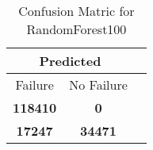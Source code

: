 \begin{table}[] 
\caption{Confusion Matric for RandomForest100} 
\label{Table: Prediction Accuracy-DMDRandomForest100OnlySunEKF-combinationReflectionperfectNoFailurePrediction-Reflection} 
\centering 
\begin{tabular} 
 {@{}ccc@{}} 
\toprule 
\multicolumn{2}{c}{\textbf{Predicted}}
 \\ \midrule 
\multicolumn{1}{|c|}{Failure} & 
\multicolumn{1}{c|}{No Failure}
 \\ \midrule 
\multicolumn{1}{|c|}{\color{green}\textbf{118410}} & 
\multicolumn{1}{c|}{\color{red}\textbf{0}}
 \\ \midrule 
\multicolumn{1}{|c|}{\color{red}\textbf{17247}} & 
\multicolumn{1}{c|}{\color{green}\textbf{34471}}
 \\ \bottomrule 
\end{tabular} 
\end{table} 

